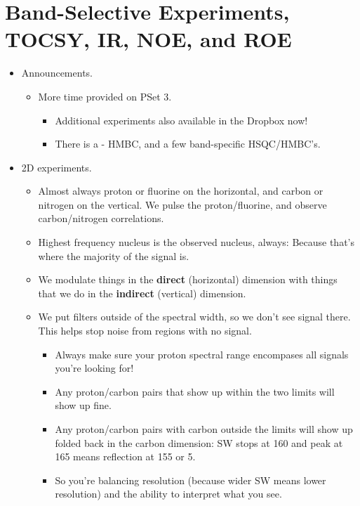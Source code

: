 \documentclass[../notes.tex]{subfiles}
\begin{document}
\section{Band-Selective Experiments, TOCSY, IR, NOE, and ROE}
\begin{itemize}
    \item {}Announcements.
    \begin{itemize}
        \item More time provided on PSet 3.
        \begin{itemize}
            \item Additional experiments also available in the Dropbox now!
            \item There is a - HMBC, and a few band-specific HSQC/HMBC's.
        \end{itemize}
    \end{itemize}
    \item 2D experiments.
    \begin{itemize}
        \item Almost always proton or fluorine on the horizontal, and carbon or nitrogen on the vertical. We pulse the proton/fluorine, and observe carbon/nitrogen correlations.
        \item Highest frequency nucleus is the observed nucleus, always: Because that's where the majority of the signal is.
        \item We modulate things in the \textbf{direct} (horizontal) dimension with things that we do in the \textbf{indirect} (vertical) dimension.
        \item We put filters outside of the spectral width, so we don't see signal there. This helps stop noise from regions with no signal.
        \begin{itemize}
            \item Always make sure your proton spectral range encompases all signals you're looking for!
            \item Any proton/carbon pairs that show up within the two limits will show up fine.
            \item Any proton/carbon pairs with carbon outside the limits will show up folded back in the carbon dimension: SW stops at \SI{160}{\partspermillion} and peak at \SI{165}{\partspermillion} means reflection at \SI{155}{\partspermillion} or \SI{5}{\partspermillion}.
            \item So you're balancing resolution (because wider SW means lower resolution) and the ability to interpret what you see.

\end{itemize}
\end{itemize}
\end{itemize}
\end{document}
